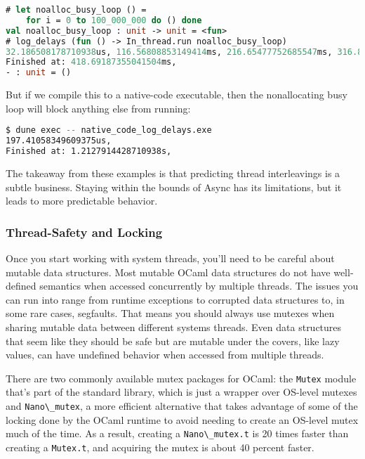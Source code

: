 \begin{lstlisting}[language=Caml]
# let noalloc_busy_loop () =
    for i = 0 to 100_000_000 do () done
val noalloc_busy_loop : unit -> unit = <fun>
# log_delays (fun () -> In_thread.run noalloc_busy_loop)
32.186508178710938us, 116.56808853149414ms, 216.65477752685547ms, 316.83063507080078ms, 417.13213920593262ms,
Finished at: 418.69187355041504ms,
- : unit = ()
\end{lstlisting}

But if we compile this to a native-code executable, then the
nonallocating busy loop will block anything else from running:

\begin{lstlisting}[language=bash]
$ dune exec -- native_code_log_delays.exe
197.41058349609375us,
Finished at: 1.2127914428710938s,
\end{lstlisting}

The takeaway from these examples is that predicting thread interleavings
is a subtle business. Staying within the bounds of Async has its
limitations, but it leads to more predictable behavior.

\hypertarget{thread-safety-and-locking}{%
\subsubsection{Thread-Safety and
Locking}\label{thread-safety-and-locking}}

Once you start working with system threads, you'll need to be careful
about mutable data structures. Most mutable OCaml data structures do not
have well-defined semantics when accessed concurrently by multiple
threads. The issues you can run into range from runtime exceptions to
corrupted data structures to, in some rare cases, segfaults. That means
you should always use mutexes when sharing mutable data between
different systems threads. Even data structures that seem like they
should be safe but are mutable under the covers, like lazy values, can
have undefined behavior when accessed from multiple threads.

There are two commonly available mutex packages for OCaml: the
\passthrough{\lstinline!Mutex!} module that's part of the standard
library, which is just a wrapper over OS-level mutexes and
\passthrough{\lstinline!Nano\_mutex!}, a more efficient alternative that
takes advantage of some of the locking done by the OCaml runtime to
avoid needing to create an OS-level mutex much of the time. As a result,
creating a \passthrough{\lstinline!Nano\_mutex.t!} is 20 times faster
than creating a \passthrough{\lstinline!Mutex.t!}, and acquiring the
mutex is about 40 percent faster.


